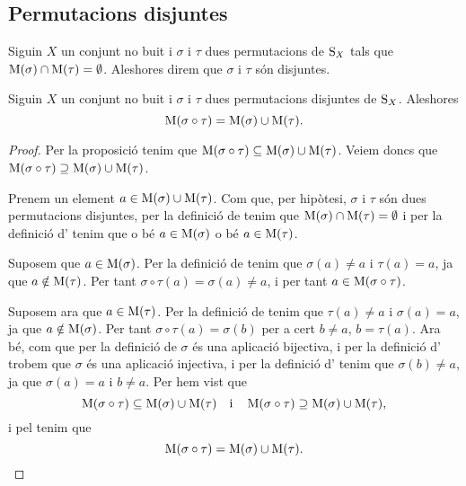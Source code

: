 \documentclass[../../Main.tex]{subfiles}
\begin{document}
	\subsection{Permutacions disjuntes}
	\begin{definition}
		\label{def:permutacions disjuntes}
		Siguin \(X\) un conjunt no buit i \(\sigma\) i \(\tau\) dues permutacions de \(\operatorname{S}_{X}\) tals que \(\operatorname{M}(\sigma)\cap\operatorname{M}(\tau)=\emptyset\). Aleshores direm que \(\sigma\) i \(\tau\) són disjuntes.
	\end{definition}
	\begin{proposition}
		\label{prop:mou de permutacions conjugades és unió dels mous de les permutacions}
		Siguin \(X\) un conjunt no buit i \(\sigma\) i \(\tau\) dues permutacions disjuntes de \(\operatorname{S}_{X}\). Aleshores
		\[\operatorname{M}(\sigma\circ\tau)=\operatorname{M}(\sigma)\cup\operatorname{M}(\tau).\]
		\begin{proof}
			Per la proposició  tenim que \(\operatorname{M}(\sigma\circ\tau)\subseteq\operatorname{M}(\sigma)\cup\operatorname{M}(\tau)\). Veiem doncs que \(\operatorname{M}(\sigma\circ\tau)\supseteq\operatorname{M}(\sigma)\cup\operatorname{M}(\tau)\).
			
			Prenem un element \(a\in\operatorname{M}(\sigma)\cup\operatorname{M}(\tau)\). Com que, per hipòtesi, \(\sigma\) i \(\tau\) són dues permutacions disjuntes, per la definició de  tenim que \(\operatorname{M}(\sigma)\cap\operatorname{M}(\tau)=\emptyset\) i per la definició d' tenim que o bé \(a\in\operatorname{M}(\sigma)\) o bé \(a\in\operatorname{M}(\tau)\).
			
			Suposem que \(a\in\operatorname{M}(\sigma)\). Per la definició de  tenim que \(\sigma(a)\neq a\) i \(\tau(a)=a\), ja que \(a\notin\operatorname{M}(\tau)\). Per tant \(\sigma\circ\tau(a)=\sigma(a)\neq a\), i per tant \(a\in\operatorname{M}(\sigma\circ\tau)\).
			
			Suposem ara que \(a\in\operatorname{M}(\tau)\). Per la definició de  tenim que \(\tau(a)\neq a\) i \(\sigma(a)=a\), ja que \(a\notin\operatorname{M}(\sigma)\). Per tant \(\sigma\circ\tau(a)=\sigma(b)\) per a cert \(b\neq a\), \(b=\tau(a)\). Ara bé, com que per la definició de  \(\sigma\) és una aplicació bijectiva, i per la definició d' trobem que \(\sigma\) és una aplicació injectiva, i per la definició d' tenim que \(\sigma(b)\neq a\), ja que \(\sigma(a)=a\) i \(b\neq a\). Per hem vist que \[\operatorname{M}(\sigma\circ\tau)\subseteq\operatorname{M}(\sigma)\cup\operatorname{M}(\tau)\quad\text{i}\quad\operatorname{M}(\sigma\circ\tau)\supseteq\operatorname{M}(\sigma)\cup\operatorname{M}(\tau),\]
			i pel  tenim que
			\[\operatorname{M}(\sigma\circ\tau)=\operatorname{M}(\sigma)\cup\operatorname{M}(\tau).\qedhere\]
		\end{proof}
	\end{proposition}
\end{document}
